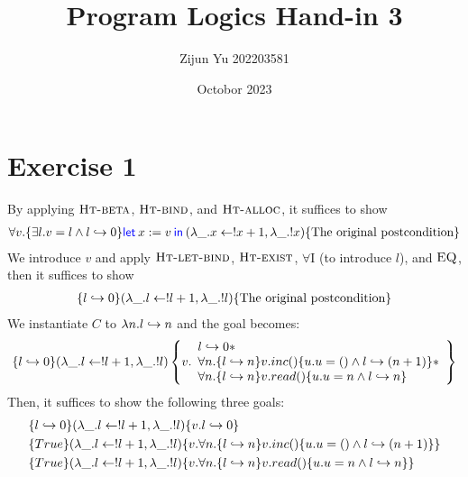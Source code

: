\documentclass{article}
\title{Program Logics Hand-in 3}
\author{Zijun Yu 202203581}
\date{Octobor 2023}
\begin{document}


\maketitle

\section*{Exercise 1}

By applying $\textsc{Ht-beta}$, $\textsc{Ht-bind}$, and $\textsc{Ht-alloc}$,
it suffices to show
\begin{align*}
    \forall v. \{\exists l. v=l \wedge l \gmapsto 0\}
    \Let{x}={v}in{(\lambda \_ . x \leftarrow !x+1, \lambda \_ . !x)}
    \{\text{The original postcondition}\}
\end{align*}
We introduce $v$ and apply $\textsc{Ht-let-bind}$, $\textsc{Ht-exist}$,
$\forall \text{I}$ (to introduce $l$), and $\textsc{EQ}$, then it suffices to show
\begin{align*}
    \{l \hookrightarrow 0\}
    (\lambda \_ . l \leftarrow !l+1, \lambda \_ . !l)
    \{\text{The original postcondition}\}
\end{align*}
We instantiate $C$ to $\lambda n. l \hookrightarrow n$ and the goal becomes:
\begin{align*}
    \{l \hookrightarrow 0\}
    (\lambda \_ . l \leftarrow !l+1, \lambda \_ . !l)
    \left\{
    v.\begin{array}{l}
          l \hookrightarrow 0 \ast                                                           \\
          \forall n. \{l \hookrightarrow n\} v.inc() \{u.u=() \wedge l \hookrightarrow (n+1)\} \ast \\
          \forall n. \{l \hookrightarrow n\} v.read() \{u.u=n \wedge l \hookrightarrow n\}
      \end{array}
    \right\}
\end{align*}
Then, it suffices to show the following three goals:
\begin{align*}
     & \{l \hookrightarrow 0\}
    (\lambda \_ . l \leftarrow !l+1, \lambda \_ . !l)
    \{v.l \hookrightarrow 0\}                                                            \\
     & \{True\}
    (\lambda \_ . l \leftarrow !l+1, \lambda \_ . !l)
    \{v. \forall n. \{l \hookrightarrow n\} v.inc() \{u.u=() \wedge l \hookrightarrow (n+1)\}\} \\
     & \{True\}
    (\lambda \_ . l \leftarrow !l+1, \lambda \_ . !l)
    \{v. \forall n. \{l \hookrightarrow n\} v.read() \{u.u=n \wedge l \hookrightarrow n\}\}
\end{align*}
\end{document}
